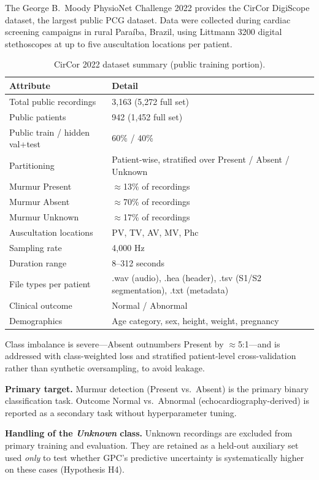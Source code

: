 \documentclass[10pt,twocolumn]{article}
\begin{document}
The George B.\ Moody PhysioNet Challenge 2022 \citep{challenge2022, circor_data} provides the CirCor DigiScope dataset, the largest public PCG dataset. Data were collected during cardiac screening campaigns in rural Paraíba, Brazil, using Littmann 3200 digital stethoscopes at up to five auscultation locations per patient.

\begin{table}[H]
\centering
\caption{CirCor 2022 dataset summary (public training portion).}
\label{tab:dataset}
\small
\begin{tabular}{p{3.2cm}p{3.8cm}}
\toprule
\textbf{Attribute} & \textbf{Detail} \\
\midrule
Total public recordings & 3,163 (5,272 full set) \\
Public patients & 942 (1,452 full set) \\
Public train / hidden val+test & 60\% / 40\% \\
Partitioning & Patient-wise, stratified over Present / Absent / Unknown \\
Murmur Present & $\approx$13\% of recordings \\
Murmur Absent & $\approx$70\% of recordings \\
Murmur Unknown & $\approx$17\% of recordings \\
Auscultation locations & PV, TV, AV, MV, Phc \\
Sampling rate & 4,000 Hz \\
Duration range & 8--312 seconds \\
File types per patient & .wav (audio), .hea (header), .tsv (S1/S2 segmentation), .txt (metadata) \\
Clinical outcome & Normal / Abnormal \\
Demographics & Age category, sex, height, weight, pregnancy \\
\bottomrule
\end{tabular}
\end{table}

Class imbalance is severe---Absent outnumbers Present by $\approx$5:1---and is addressed with class-weighted loss and stratified patient-level cross-validation rather than synthetic oversampling, to avoid leakage.

\textbf{Primary target.} Murmur detection (Present vs.\ Absent) is the primary binary classification task. Outcome Normal vs.\ Abnormal (echocardiography-derived) is reported as a secondary task without hyperparameter tuning.

\textbf{Handling of the \textit{Unknown} class.} Unknown recordings are excluded from primary training and evaluation. They are retained as a held-out auxiliary set used \textit{only} to test whether GPC's predictive uncertainty is systematically higher on these cases (Hypothesis H4).
\end{document}
